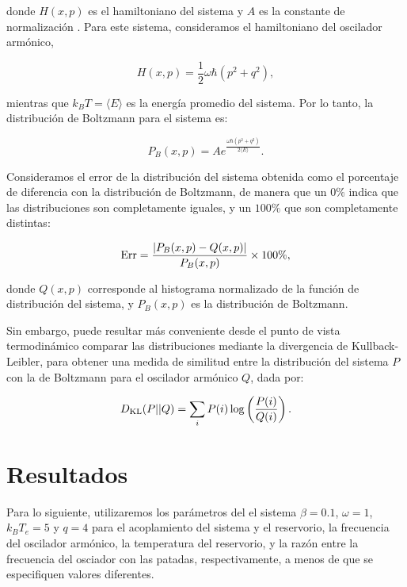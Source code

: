 \documentclass[letterpaper,12pt,oneside]{book}
\begin{document}
	\noindent donde $H(x,p)$ es el hamiltoniano del sistema y $A$ es la constante de normalización \cite{CursoFisEstadistica}. Para este sistema, consideramos el hamiltoniano del oscilador arm\'onico, 
	
	\begin{equation}
	H(x,p) = \frac{1}{2}\omega\hbar(p^2 + q^2),
	\end{equation}
	
	\noindent mientras que $k_BT = \langle E \rangle$ es la energía promedio del sistema. Por lo tanto, la distribución de Boltzmann para el sistema es:
	
	\begin{equation}
	P_B(x,p) = Ae^{\frac{\omega\hbar(p^2+q^2)}{2\langle E \rangle }}.
	\end{equation}
	
	Consideramos el error de la distribución del sistema obtenida como el porcentaje de diferencia con la distribución de Boltzmann, de manera que un $0\%$ indica que las distribuciones son completamente iguales, y un $100\%$ que son completamente distintas:
	
	\begin{equation}\label{eq:ErrorTotal}
	{\rm Err} =  \frac{|P_B(x,p) - Q(x,p)|}{P_B(x,p)} \times 100 \%,
	\end{equation}
	
	\noindent donde $Q(x,p)$ corresponde al histograma normalizado de la función de distribución del sistema, y $P_B(x,p)$ es la distribución de Boltzmann.
	
	Sin embargo, puede resultar más conveniente desde el punto de vista termodinámico comparar las distribuciones mediante la divergencia de Kullback-Leibler, para obtener una medida de similitud entre la distribución del sistema $P$ con la de Boltzmann para el oscilador armónico $Q$, dada por:
	
	
	\begin{equation}
	D_{\rm KL}(P||Q) = \sum_i P(i)\log\left(\frac{P(i)}{Q(i)}\right).
	\end{equation}
	
\chapter{Resultados}

Para lo siguiente, utilizaremos los par\'ametros del el sistema $\beta=0.1$, $\omega=1$, $k_BT_e=5$ y $q=4$ para el acoplamiento del sistema y el reservorio, la frecuencia del oscilador arm\'onico, la temperatura del reservorio, y la raz\'on entre la frecuencia del osciador con las patadas, respectivamente, a menos de que se especifiquen valores diferentes. 
\end{document}
